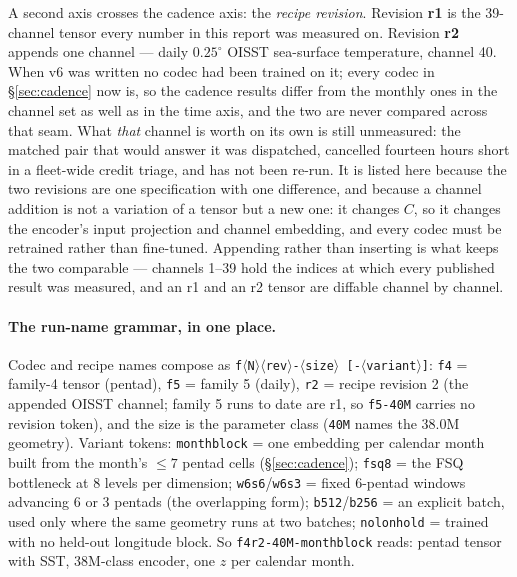 \documentclass[10pt]{article}
\begin{document}
A second axis crosses the cadence axis: the \emph{recipe revision}.
Revision \textbf{r1} is the 39-channel tensor every number in this report
was measured on. Revision \textbf{r2} appends one channel --- daily
$0.25^\circ$ OISST sea-surface temperature, channel 40. When v6 was written
no codec had been trained on it; every codec in \S\ref{sec:cadence} now is,
so the cadence results differ from the monthly ones in the channel set as
well as in the time axis, and the two are never compared across that seam.
What \emph{that} channel is worth on its own is still unmeasured: the
matched pair that would answer it was dispatched, cancelled fourteen hours
short in a fleet-wide credit triage, and has not been re-run. It is
listed here because the two revisions are one specification with one
difference, and because a channel addition is not a variation of a tensor
but a new one: it changes $C$, so it changes the encoder's input projection
and channel embedding, and every codec must be retrained rather than
fine-tuned. Appending rather than inserting is what keeps the two comparable
--- channels 1--39 hold the indices at which every published result was
measured, and an r1 and an r2 tensor are diffable channel by channel.

\paragraph{The run-name grammar, in one place.} Codec and recipe names
compose as
\texttt{f$\langle$N$\rangle$$\langle$rev$\rangle$-$\langle$size$\rangle$%
[-$\langle$variant$\rangle$]}: \texttt{f4} = family-4 tensor (pentad),
\texttt{f5} = family 5 (daily), \texttt{r2} = recipe revision 2 (the
appended OISST channel; family 5 runs to date are r1, so \texttt{f5-40M}
carries no revision token), and the size is the parameter class
(\texttt{40M} names the 38.0M geometry). Variant tokens:
\texttt{monthblock} = one embedding per calendar month built from the
month's $\le 7$ pentad cells (\S\ref{sec:cadence}); \texttt{fsq8} = the
FSQ bottleneck at 8 levels per dimension; \texttt{w6s6}/\texttt{w6s3} =
fixed 6-pentad windows advancing 6 or 3 pentads (the overlapping form);
\texttt{b512}/\texttt{b256} = an explicit batch, used only where the same
geometry runs at two batches; \texttt{nolonhold} = trained with no
held-out longitude block. So \texttt{f4r2-40M-monthblock} reads: pentad
tensor with SST, 38M-class encoder, one $z$ per calendar month.
\end{document}
